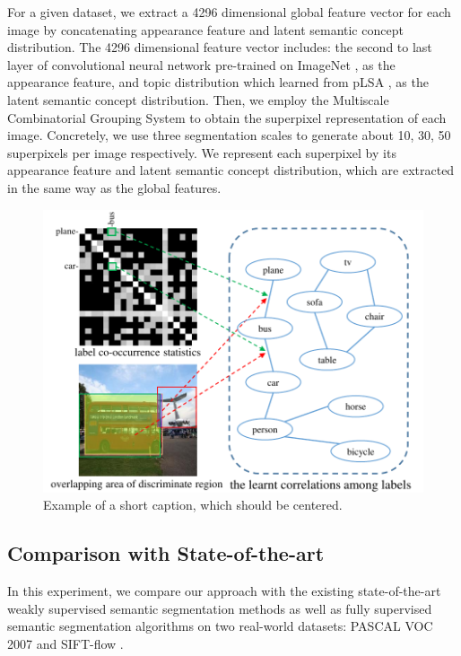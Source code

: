 For a given dataset, we extract a 4296 dimensional global feature vector for each image by concatenating appearance feature and latent semantic concept distribution. The 4296 dimensional feature vector includes: the second to last layer of convolutional neural network \cite{simonyan2014very} pre-trained on ImageNet \cite{russakovsky2014imagenet}, as the appearance feature, and topic distribution which learned from pLSA \cite{hofmann1999probabilistic}, as the latent semantic concept distribution.
Then, we employ the Multiscale Combinatorial Grouping System \cite{arbelaez2014multiscale} to obtain the superpixel representation of each image. Concretely, we use three segmentation scales to generate about 10, 30, 50 superpixels per image respectively. We represent each superpixel by its appearance feature and latent semantic concept distribution, which are extracted in the same way as the global features.

\begin{figure}[!htb]
    \begin{center}
        \includegraphics[width=1\linewidth]{fig_correlations.pdf}
    \end{center}
    \caption{Example of a short caption, which should be centered.}
    \label{fig:correlations}
\end{figure}

\subsection{Comparison with State-of-the-art}
In this experiment, we compare our approach with the existing state-of-the-art weakly supervised semantic segmentation methods as well as fully supervised semantic segmentation algorithms on two real-world datasets: PASCAL VOC 2007 \cite{pascal-voc-2007} and SIFT-flow \cite{liu2011nonparametric}.

